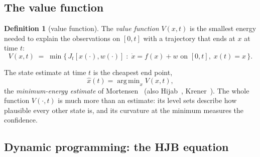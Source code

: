 \documentclass[11pt,a4paper]{article}
\newcommand{\argmin}{\operatorname{arg\,min}}
\newcommand{\xh}{\hat{x}}
\theoremstyle{plain}
\theoremstyle{definition}
\newtheorem{definition}{Definition}
\theoremstyle{remark}
\begin{document}
\subsection{The value function}

\begin{definition}[value function]
The \emph{value function} $V(x,t)$ is the smallest energy needed to explain the observations on $[0,t]$ with a trajectory that ends at $x$ at time $t$:
\begin{equation}
  V(x,t) \;=\; \min\Big\{\, J_t[x(\cdot),w(\cdot)] \;:\; \dot x = f(x)+w \text{ on }[0,t],\; x(t)=x \,\Big\}.
  \label{eq:value}
\end{equation}
\end{definition}
The state estimate at time $t$ is the cheapest end point,
\begin{equation}
  \xh(t) = \argmin_x V(x,t),
  \label{eq:estimate}
\end{equation}
the \emph{minimum-energy estimate} of Mortensen~\cite{Mortensen1968} (also Hijab~\cite{Hijab1980}, Krener~\cite{Krener2003}). The whole function $V(\cdot,t)$ is much more than an estimate: its level sets describe how plausible every other state is, and its curvature at the minimum measures the confidence.

\subsection{Dynamic programming: the HJB equation}
\label{sec:hjb}
\end{document}

